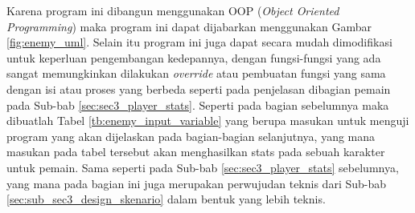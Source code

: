 Karena program ini dibangun menggunakan OOP (\textit{Object Oriented Programming}) maka program ini dapat dijabarkan menggunakan Gambar \ref{fig:enemy_uml}. Selain itu program ini juga dapat secara mudah dimodifikasi untuk keperluan pengembangan kedepannya, dengan fungsi-fungsi yang ada sangat memungkinkan dilakukan \textit{override} atau pembuatan fungsi yang sama dengan isi atau proses yang berbeda seperti pada penjelasan dibagian pemain pada Sub-bab \ref{sec:sec3_player_stats}. Seperti pada bagian sebelumnya maka dibuatlah Tabel \ref{tb:enemy_input_variable} yang berupa masukan untuk menguji program yang akan dijelaskan pada bagian-bagian selanjutnya, yang mana masukan pada tabel tersebut akan menghasilkan stats pada sebuah karakter untuk pemain. Sama seperti pada Sub-bab \ref{sec:sec3_player_stats} sebelumnya, yang mana pada bagian ini juga merupakan perwujudan teknis dari Sub-bab \ref{sec:sub_sec3_design_skenario} dalam bentuk yang lebih teknis.
\vspace{-1ex}

